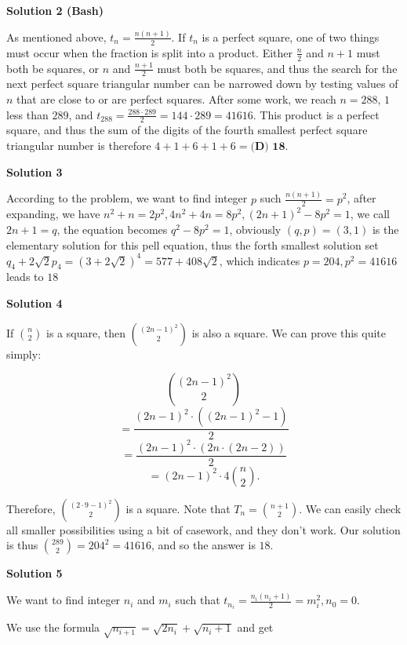 \begin{enumerate}
\textbf{Solution 2 (Bash)}

As mentioned above, $t_n = \frac{n (n+1)}{2}$. If $t_n$ is a perfect square, one of two things must occur when the fraction is split into a product. Either $\frac{n}{2}$ and $n+1$ must both be squares, or $n$ and $\frac{n+1}{2}$ must both be squares, and thus the search for the next perfect square triangular number can be narrowed down by testing values of $n$ that are close to or are perfect squares. After some work, we reach $n = 288$, $1$ less than $289$, and $t_{288} = \frac{288\cdot289}{2} = 144 \cdot 289 = 41616$. This product is a perfect square, and thus the sum of the digits of the fourth smallest perfect square triangular number is therefore $4+1+6+1+6=\boxed{\textbf{(D) 18}}$. 

 



\textbf{Solution 3}

According to the problem, we want to find integer $p$ such $\frac{n(n+1)}{2}=p^2$, after expanding, we have $n^2+n=2p^2, 4n^2+4n=8p^2, (2n+1)^2-8p^2=1$, we call $2n+1=q$, the equation becomes $q^2-8p^2=1$, obviously $(q,p)=(3,1)$ is the elementary solution for this pell equation, thus the forth smallest solution set $q_4+2\sqrt{2}p_4=(3+2\sqrt{2})^4=577+408\sqrt{2}$, which indicates $p=204, p^2=41616$ leads to $\boxed{18}$




\textbf{Solution 4}

If $n \choose 2$ is a square, then ${(2n-1)^2 \choose 2}$ is also a square. We can prove this quite simply:

 
 \[{(2n-1)^2 \choose 2}\]
 \[= \frac{(2n-1)^2 \cdot ((2n-1)^2 - 1)}{2}\]
 \[= \frac{(2n-1)^2 \cdot (2n \cdot (2n - 2))}{2}\]
 \[= (2n-1)^2 \cdot 4{n \choose 2}.\]

 Therefore, ${(2 \cdot 9 - 1)^2 \choose 2}$ is a square. Note that $T_n = {n+1 \choose 2}$. We can easily check all smaller possibilities using a bit of casework, and they don't work. Our solution is thus ${289 \choose 2} = 204^2 = 41616$, and so the answer is $\boxed{18}$.

 



\textbf{Solution 5}

We want to find integer $n_i$ and $m_i$ such that $t_{n_i} =\frac{n_i (n_i + 1)}{2}=m_i^2, n_0 = 0.$

 We use the formula $\sqrt{n_{i+1}} = \sqrt{2n_i} + \sqrt{n_i + 1}$ and get


\end{enumerate}
